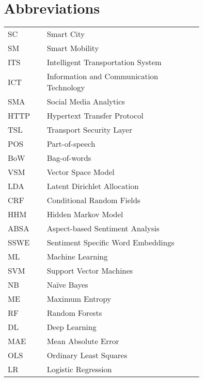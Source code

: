 \chapter*{Abbreviations}

\begin{flushleft}
	\begin{tabular}{l p{0.8\linewidth}}
		SC      & Smart City \\
		SM		& Smart Mobility \\
		ITS      & Intelligent Transportation System \\
		ICT		& Information and Communication Technology \\
		SMA		& Social Media Analytics \\
		HTTP	& Hypertext Transfer Protocol \\
		TSL		& Transport Security Layer \\
		POS		& Part-of-speech \\
		BoW		& Bag-of-words \\
		VSM		& Vector Space Model \\
		LDA		& Latent Dirichlet Allocation \\
		CRF		& Conditional Random Fields \\
		HHM		& Hidden Markov Model \\
		ABSA	& Aspect-based Sentiment Analysis \\
		SSWE	& Sentiment Specific Word Embeddings \\
		ML		& Machine Learning \\
		SVM		& Support Vector Machines \\
		NB 		& Naïve Bayes \\
		ME		& Maximum Entropy \\
		RF		& Random Forests \\
		DL		& Deep Learning \\
		MAE		& Mean Absolute Error \\
		OLS		& Ordinary Least Squares \\
		LR		& Logistic Regression
	\end{tabular}
\end{flushleft}

